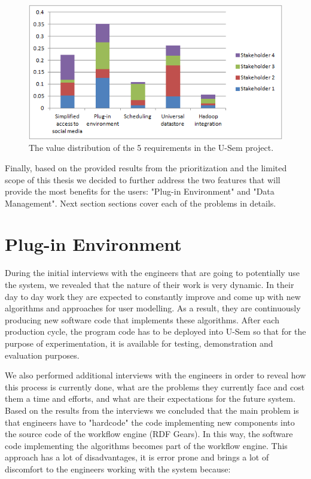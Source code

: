 \begin{figure}[h!]
  \centering
      \includegraphics{requirements/value_diagram.png}
  \caption{The value distribution of the 5 requirements in the U-Sem project.}
  \label{fig:reqPriority}
\end{figure}


Finally, based on the provided results from the prioritization and the limited scope of this thesis we decided to further address the two features that will provide the most benefits for the users: "Plug-in Environment" and "Data Management". Next section sections cover each of the problems in details.

\section{Plug-in Environment}
\label{sec:problemDefPlugin}

During the initial interviews with the engineers that are going to potentially use the system, we revealed that the nature of their work is very dynamic. In their day to day work they are expected to constantly improve and come up with new algorithms and approaches for user modelling. As a result, they are continuously producing new software code that implements these algorithms. After each production cycle, the program code has to be deployed into U-Sem so that for the purpose of experimentation, it is available for testing, demonstration and evaluation purposes.

We also performed additional interviews with the engineers in order to reveal how this process is currently done, what are the problems they currently face and cost them a time and efforts, and what are their expectations for the future system. Based on the results from the interviews we concluded that the main problem is that engineers have to "hardcode" the code implementing new components into the source code of the workflow engine (RDF Gears). In this way, the software code implementing the algorithms becomes part of the workflow engine. This approach has a lot of disadvantages, it is error prone and brings a lot of discomfort to the engineers working with the system because:

